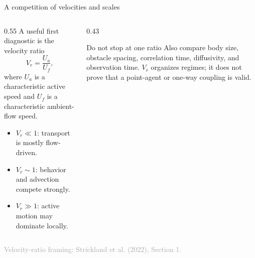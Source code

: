 \documentclass[aspectratio=169,11pt]{beamer}
\newcommand{\sourcecredit}[1]{\vfill\begin{flushright}\tiny\textcolor{DarkGray}{#1}\end{flushright}}
\begin{document}
\begin{frame}{A competition of velocities and scales}
\begin{columns}[T,onlytextwidth]
  \begin{column}{0.55\textwidth}
    A useful first diagnostic is the velocity ratio
    \[
      V_r=\frac{U_a}{U_f},
    \]
    where $U_a$ is a characteristic active speed and $U_f$ is a characteristic ambient-flow speed.
    \begin{itemize}
      \item $V_r\ll1$: transport is mostly flow-driven.
      \item $V_r\sim1$: behavior and advection compete strongly.
      \item $V_r\gg1$: active motion may dominate locally.
    \end{itemize}
  \end{column}
  \begin{column}{0.43\textwidth}
    \begin{block}{Do not stop at one ratio}
      Also compare body size, obstacle spacing, correlation time, diffusivity, and observation time. $V_r$ organizes regimes; it does not prove that a point-agent or one-way coupling is valid.
    \end{block}
  \end{column}
\end{columns}
\sourcecredit{Velocity-ratio framing: Strickland et al. (2022), Section 1.}
\end{frame}
\end{document}
